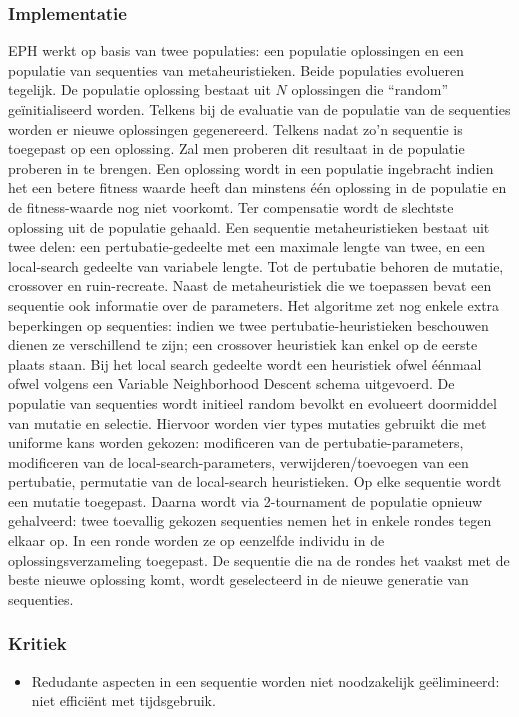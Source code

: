 \subsubsection{Implementatie}
EPH\cite{chesc-eph} werkt op basis van twee populaties: een populatie oplossingen en een populatie van sequenties van metaheuristieken. Beide populaties evolueren tegelijk. De populatie oplossing bestaat uit $N$ oplossingen die ``random'' ge\"initialiseerd worden. Telkens bij de evaluatie van de populatie van de sequenties worden er nieuwe oplossingen gegenereerd. Telkens nadat zo'n sequentie is toegepast op een oplossing. Zal men proberen dit resultaat in de populatie proberen in te brengen. Een oplossing wordt in een populatie ingebracht indien het een betere fitness waarde heeft dan minstens \'e\'en oplossing in de populatie en de fitness-waarde nog niet voorkomt. Ter compensatie wordt de slechtste oplossing uit de populatie gehaald. Een sequentie metaheuristieken bestaat uit twee delen: een pertubatie-gedeelte met een maximale lengte van twee, en een local-search gedeelte van variabele lengte. Tot de pertubatie behoren de mutatie, crossover en ruin-recreate. Naast de 
metaheuristiek die we toepassen bevat een sequentie ook informatie over de parameters. Het algoritme zet nog enkele extra beperkingen op sequenties: indien we twee pertubatie-heuristieken beschouwen dienen ze verschillend te zijn; een crossover heuristiek kan enkel op de eerste plaats staan. Bij het local search gedeelte wordt een heuristiek ofwel \'e\'enmaal ofwel volgens een Variable Neighborhood Descent schema\cite{hom/vns} uitgevoerd. De populatie van sequenties wordt initieel random bevolkt en evolueert doormiddel van mutatie en selectie. Hiervoor worden vier types mutaties gebruikt die met uniforme kans worden gekozen: modificeren van de pertubatie-parameters, modificeren van de local-search-parameters, verwijderen/toevoegen van een pertubatie, permutatie van de local-search heuristieken. Op elke sequentie wordt een mutatie toegepast. Daarna wordt via 2-tournament de populatie opnieuw gehalveerd: twee toevallig gekozen sequenties nemen het in enkele rondes tegen elkaar op. In een ronde worden ze op 
eenzelfde individu in de oplossingsverzameling toegepast. De sequentie die na de rondes het vaakst met de beste nieuwe oplossing komt, wordt geselecteerd in de nieuwe generatie van sequenties.
\subsubsection{Kritiek}
\begin{itemize}
 \item Redudante aspecten in een sequentie worden niet noodzakelijk ge\"elimineerd: niet effici\"ent met tijdsgebruik.
\end{itemize}
